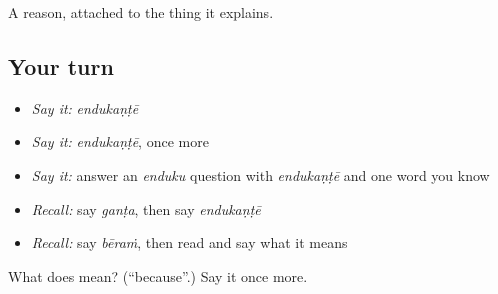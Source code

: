 \begin{grammarlens}[title={What you've built}]
A reason, attached to the thing it explains.
\end{grammarlens}

\subsection*{Your turn}
\begin{itemize}
\raggedright
  \item \emph{Say it:} \emph{endukaṇṭē}
  \item \emph{Say it:} \emph{endukaṇṭē}, once more
  \item \emph{Say it:} answer an \emph{enduku} question with \emph{endukaṇṭē} and one word you know
  \item \emph{Recall:} say \emph{ganṭa}, then say \emph{endukaṇṭē}
  \item \emph{Recall:} say \emph{bēraṁ}, then read \textbf{} and say what it means
\end{itemize}

\begin{tcolorbox}[breakable,colback=teal!4,colframe=teal!35!black,title={Before you move on}]
What does  mean? (\textquotedblleft{}because\textquotedblright{}.) Say it once more.
\end{tcolorbox}
